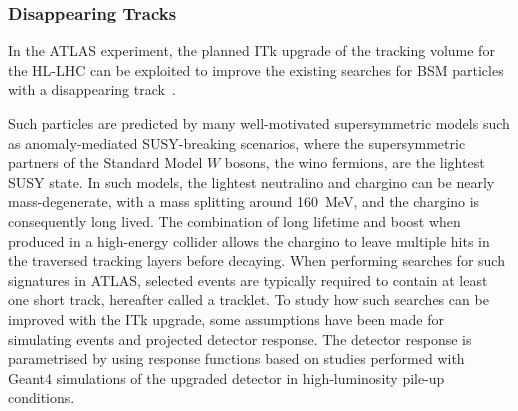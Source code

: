 \subsubsection{Disappearing Tracks}

In the ATLAS experiment, the planned ITk upgrade of the tracking volume for the HL-LHC can be exploited to improve the existing searches for BSM particles with a disappearing track~\cite{Collaboration:2285585}.

Such particles are predicted by many well-motivated supersymmetric models such as anomaly-mediated SUSY-breaking scenarios, where the supersymmetric partners of the Standard Model $W$ bosons, the wino fermions, are the lightest SUSY state. In such models, the lightest neutralino and chargino can be nearly mass-degenerate, with a mass splitting around 160~MeV, and the chargino is consequently long lived. The combination of long lifetime and boost when produced in a high-energy collider allows the chargino
to leave multiple hits in the traversed tracking layers before decaying. When performing searches for such signatures in ATLAS, selected events are typically required to contain at least one short track, hereafter called a tracklet. To study how such searches can be improved with the ITk upgrade, some assumptions have been made for simulating events and projected detector response. The detector response is parametrised by using response functions based on studies performed with Geant4 simulations of the upgraded detector in high-luminosity pile-up conditions.


